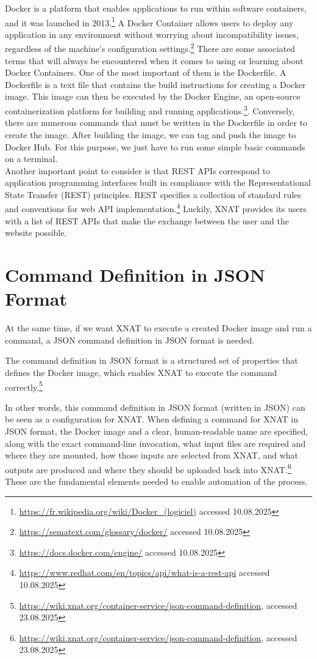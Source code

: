 Docker is a platform that enables applications to run within software containers, and it was launched in 2013.\footnote{\url{https://fr.wikipedia.org/wiki/Docker\_(logiciel)} accessed 10.08.2025} A Docker Container allows users to deploy any application in any environment without worrying about incompatibility issues, regardless of the machine’s configuration settings.\footnote{\url{https://sematext.com/glossary/docker/} accessed 10.08.2025} There are some associated terms that will always be encountered when it comes to using or learning about Docker Containers.
One of the most important of them is the Dockerfile. A Dockerfile is a text file that contains the build instructions for creating a Docker image. This image can then be executed by the Docker Engine, an open-source containerization platform for building and running applications.\footnote{\url{https://docs.docker.com/engine/}{ accessed 10.08.2025}}. Conversely, there are numerous commands that must be written in the Dockerfile in order to create the image. After building the image, we can tag and push the image to Docker Hub. For this purpose, we just have to run some simple basic commands on a terminal.
\\
Another important point to consider is that REST APIs correspond to application programming interfaces built in compliance with the Representational State Transfer (REST) principles.
REST specifies a collection of standard rules and conventions for web API implementation.\footnote{\url{https://www.redhat.com/en/topics/api/what-is-a-rest-api} accessed 10.08.2025} Luckily, XNAT provides its users with a list of REST APIs that make the exchange between the user and the website possible. 

\section{Command Definition in JSON Format}
At the same time, if we want XNAT to execute a created Docker image and run a command, a \ac{JSON} command definition in JSON format is needed. 

The command definition in \ac{JSON} format is a structured set of properties that defines the Docker image, which enables XNAT to execute the command correctly.\footnote{\url{https://wiki.xnat.org/container-service/json-command-definition}, accessed 23.08.2025}

In other words, this command definition in JSON format (written in JSON) can be seen as a configuration for XNAT. When defining a command for XNAT in JSON format, the Docker image and a clear, human-readable name are specified, along with the exact command-line invocation, what input files are required and where they are mounted, how those inputs are selected from XNAT, and what outputs are produced and where they should be uploaded back into XNAT.\footnote{\url{https://wiki.xnat.org/container-service/json-command-definition}, accessed 23.08.2025}
These are the fundamental elements needed to enable automation of the process.


